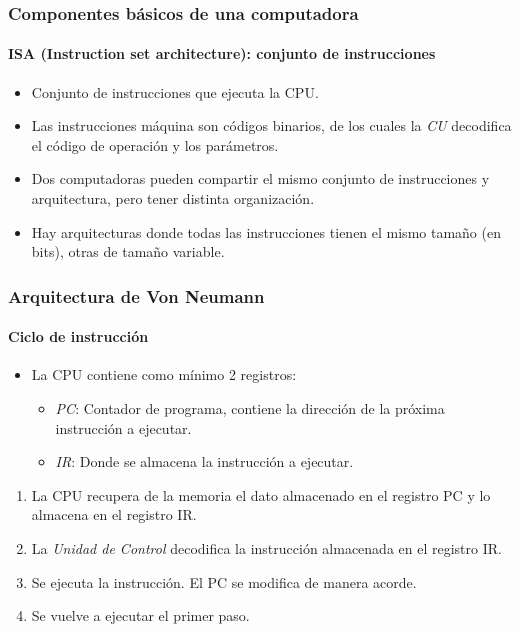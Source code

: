 \documentclass[11pt,a4paper,spanish]{beamer}
\begin{document}
\begin{frame}
    \frametitle{Componentes básicos de una computadora}
    \framesubtitle{ISA (Instruction set architecture): conjunto de
    instrucciones}
    \pause
    \begin{itemize}
        \item Conjunto de instrucciones que ejecuta la CPU. \pause
        \item Las instrucciones máquina son códigos binarios, de los cuales la
            \emph{CU} decodifica el código de operación y los parámetros.
            \pause
        \item Dos computadoras pueden compartir el mismo conjunto de
            instrucciones y arquitectura, pero tener distinta organización.
            \pause
        \item Hay arquitecturas donde todas las instrucciones tienen el mismo
            tamaño (en bits), otras de tamaño variable.
    \end{itemize}
\end{frame}

\begin{frame}
    \frametitle{Arquitectura de Von Neumann}
    \framesubtitle{Ciclo de instrucción}

    \begin{itemize}
        \item La CPU contiene como mínimo 2 registros:
        \begin{itemize}
            \item \emph{PC}: Contador de programa, contiene la dirección de la
                próxima instrucción a ejecutar.
            \item \emph{IR}: Donde se almacena la instrucción a ejecutar.
        \end{itemize}
    \end{itemize}
    \pause
    \begin{enumerate}
        \item La CPU recupera de la memoria el dato almacenado en el registro
            PC y lo almacena en el registro IR. \pause
        \item La \emph{Unidad de Control} decodifica la instrucción almacenada
            en el registro IR. \pause
        \item Se ejecuta la instrucción. El PC se modifica de manera acorde.
            \pause
        \item Se vuelve a ejecutar el primer paso. \pause
    \end{enumerate}
\end{frame}
\end{document}
